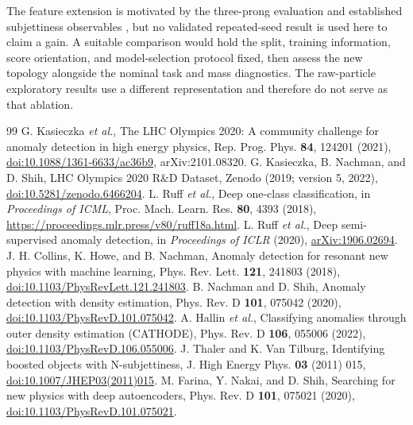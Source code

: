 \documentclass[reprint,aps,pra,amsmath,amssymb,floatfix,raggedbottom]{revtex4-2}
\begin{document}
The feature extension is motivated by the three-prong evaluation and established subjettiness observables \cite{tau}, but no validated repeated-seed result is used here to claim a gain. A suitable comparison would hold the split, training information, score orientation, and model-selection protocol fixed, then assess the new topology alongside the nominal task and mass diagnostics. The raw-particle exploratory results use a different representation and therefore do not serve as that ablation.

\begin{thebibliography}{99}
 G. Kasieczka \textit{et al.}, The LHC Olympics 2020: A community challenge for anomaly detection in high energy physics, Rep. Prog. Phys. \textbf{84}, 124201 (2021), \href{https://doi.org/10.1088/1361-6633/ac36b9}{doi:10.1088/1361-6633/ac36b9}, arXiv:2101.08320.
 G. Kasieczka, B. Nachman, and D. Shih, LHC Olympics 2020 R\&D Dataset, Zenodo (2019; version 5, 2022), \href{https://doi.org/10.5281/zenodo.6466204}{doi:10.5281/zenodo.6466204}.
 L. Ruff \textit{et al.}, Deep one-class classification, in \textit{Proceedings of ICML}, Proc. Mach. Learn. Res. \textbf{80}, 4393 (2018), \url{https://proceedings.mlr.press/v80/ruff18a.html}.
 L. Ruff \textit{et al.}, Deep semi-supervised anomaly detection, in \textit{Proceedings of ICLR} (2020), \href{https://arxiv.org/abs/1906.02694}{arXiv:1906.02694}.
 J. H. Collins, K. Howe, and B. Nachman, Anomaly detection for resonant new physics with machine learning, Phys. Rev. Lett. \textbf{121}, 241803 (2018), \href{https://doi.org/10.1103/PhysRevLett.121.241803}{doi:10.1103/PhysRevLett.121.241803}.
 B. Nachman and D. Shih, Anomaly detection with density estimation, Phys. Rev. D \textbf{101}, 075042 (2020), \href{https://doi.org/10.1103/PhysRevD.101.075042}{doi:10.1103/PhysRevD.101.075042}.
 A. Hallin \textit{et al.}, Classifying anomalies through outer density estimation (CATHODE), Phys. Rev. D \textbf{106}, 055006 (2022), \href{https://doi.org/10.1103/PhysRevD.106.055006}{doi:10.1103/PhysRevD.106.055006}.
 J. Thaler and K. Van Tilburg, Identifying boosted objects with N-subjettiness, J. High Energy Phys. \textbf{03} (2011) 015, \href{https://doi.org/10.1007/JHEP03(2011)015}{doi:10.1007/JHEP03(2011)015}.
 M. Farina, Y. Nakai, and D. Shih, Searching for new physics with deep autoencoders, Phys. Rev. D \textbf{101}, 075021 (2020), \href{https://doi.org/10.1103/PhysRevD.101.075021}{doi:10.1103/PhysRevD.101.075021}.

\end{thebibliography}
\end{document}
